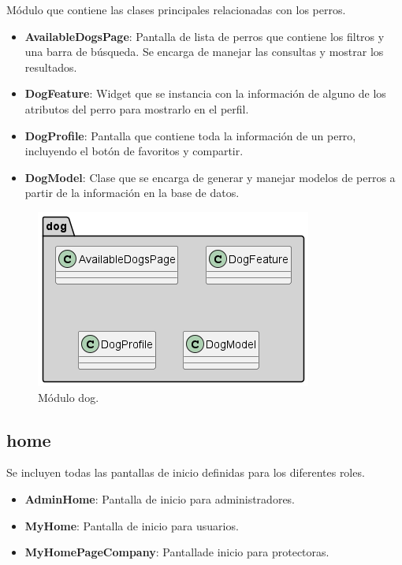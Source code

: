 \documentclass[a4paper, 12pt]{article}
\begin{document}
Módulo que contiene las clases principales relacionadas con los perros.

\begin{itemize}[noitemsep]
	\item \textbf{AvailableDogsPage}: Pantalla de lista de perros que contiene los filtros y una barra de búsqueda. Se encarga de manejar las consultas y mostrar los resultados.
	\item \textbf{DogFeature}: Widget que se instancia con la información de alguno de los atributos del perro para mostrarlo en el perfil.
	\item \textbf{DogProfile}: Pantalla que contiene toda la información de un perro, incluyendo el botón de favoritos y compartir.
	\item \textbf{DogModel}: Clase que se encarga de generar y manejar modelos de perros a partir de la información en la base de datos. 
\end{itemize}

\begin{figure}[H]
	\begin{center}
		{\includegraphics[width=0.8\linewidth]{diagram/Dog.png}\par}
		\caption{Módulo dog.}
	\end{center}
\end{figure}


\subsection*{home}

Se incluyen todas las pantallas de inicio definidas para los diferentes roles.

\begin{itemize}[noitemsep]
	\item \textbf{AdminHome}: Pantalla de inicio para administradores.
	\item \textbf{MyHome}: Pantalla de inicio para usuarios.
	\item \textbf{MyHomePageCompany}: Pantallade inicio para protectoras.
\end{itemize}
\end{document}
